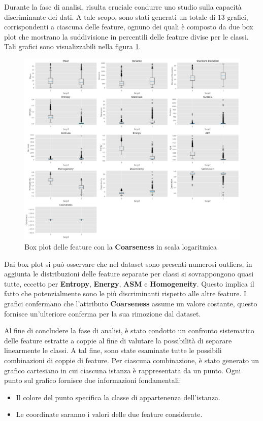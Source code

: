 Durante la fase di analisi, risulta cruciale condurre uno studio sulla capacità
discriminante dei dati. A tale scopo, sono stati generati un totale di $13$
grafici, corrispondenti a ciascuna delle feature, ognuno dei quali è composto da 
due box plot che mostrano la suddivisione in percentili delle feature divise per 
le classi. Tali grafici sono visualizzabili nella figura \ref{fig:boxplot_feature}.
\newpage
\begin{figure}[!ht]
      \centering
      \includegraphics[width=\textwidth]{img/analisi/boxplot.png}
      \caption{Box plot delle feature con la \textbf{Coarseness} in scala logaritmica}
      \label{fig:boxplot_feature}
\end{figure}

Dai box plot si può osservare che nel dataset sono presenti numerosi outliers, in
aggiunta le distribuzioni delle feature separate per classi si sovrappongono
quasi tutte, eccetto per \textbf{Entropy}, \textbf{Energy}, \textbf{ASM} e
\textbf{Homogeneity}. Questo implica il fatto che potenzialmente sono le più
discriminanti rispetto alle altre feature. I grafici confermano che l'attributo
\textbf{Coarseness} assume un valore costante, questo fornisce un'ulteriore
conferma per la sua rimozione dal dataset.

Al fine di concludere la fase di analisi, è stato condotto un confronto
sistematico delle feature estratte a coppie al fine di valutare la possibilità
di separare linearmente le classi. A tal fine, sono state esaminate tutte le
possibili combinazioni di coppie di feature. Per ciascuna combinazione, è stato
generato un grafico cartesiano in cui ciascuna istanza è rappresentata da un
punto. Ogni punto sul grafico fornisce due informazioni fondamentali:
\begin{itemize}
      \item Il colore del punto specifica la classe di appartenenza dell'istanza.
      \item Le coordinate saranno i valori delle due feature considerate.
\end{itemize}

